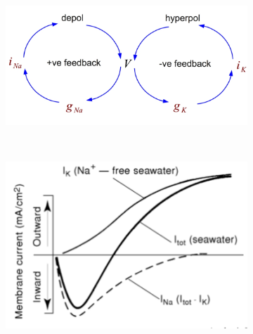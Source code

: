 \documentclass[a4paper, 12pt]{article}
\begin{document}
\begin{figure}[H]
	\centering
	\begin{subfigure}[b]{0.5\textwidth}
    	\centering
		\includegraphics[width=\textwidth]{5_7.jpg}
	\end{subfigure}%
	~
	\begin{subfigure}[b]{0.5\textwidth}
		\centering
		\includegraphics[width=\textwidth]{voltage_clamp_01.png}
	\end{subfigure}
\end{figure}
\end{document}
